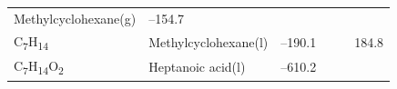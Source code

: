 \documentclass[
]{book}
\theoremstyle{definition}
\theoremstyle{definition}
\theoremstyle{definition}
\theoremstyle{remark}
\begin{document}
\begin{longtable}[]{@{}llllll@{}}
\begin{minipage}[t]{0.17\columnwidth}
Methylcyclohexane(g)\strut
\end{minipage} & \begin{minipage}[t]{0.15\columnwidth}\raggedright
--154.7\strut
\end{minipage} & \begin{minipage}[t]{0.15\columnwidth}\raggedright
\strut
\end{minipage} & \begin{minipage}[t]{0.14\columnwidth}\raggedright
\strut
\end{minipage} & \begin{minipage}[t]{0.14\columnwidth}\raggedright
\strut
\end{minipage}\tabularnewline
\begin{minipage}[t]{0.07\columnwidth}\raggedright
C\textsubscript{7}H\textsubscript{14}\strut
\end{minipage} & \begin{minipage}[t]{0.17\columnwidth}\raggedright
Methylcyclohexane(l)\strut
\end{minipage} & \begin{minipage}[t]{0.15\columnwidth}\raggedright
--190.1\strut
\end{minipage} & \begin{minipage}[t]{0.15\columnwidth}\raggedright
\strut
\end{minipage} & \begin{minipage}[t]{0.14\columnwidth}\raggedright
\strut
\end{minipage} & \begin{minipage}[t]{0.14\columnwidth}\raggedright
184.8\strut
\end{minipage}\tabularnewline
\begin{minipage}[t]{0.07\columnwidth}\raggedright
C\textsubscript{7}H\textsubscript{14}O\textsubscript{2}\strut
\end{minipage} & \begin{minipage}[t]{0.17\columnwidth}\raggedright
Heptanoic acid(l)\strut
\end{minipage} & \begin{minipage}[t]{0.15\columnwidth}\raggedright
--610.2\strut
\end{minipage} & \begin{minipage}[t]{0.15\columnwidth}\raggedright
\strut
\end{minipage} & \begin{minipage}[t]{0.14\columnwidth}\raggedright
\strut
\end{minipage} & \begin{minipage}[t]{0.14\columnwidth}\raggedright

\end{minipage}
\end{longtable}
\end{document}
